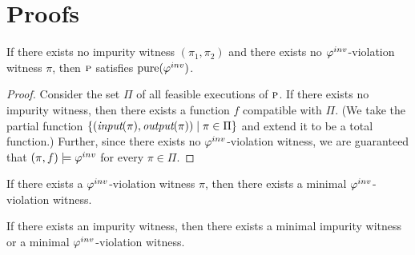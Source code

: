\section{Proofs}

\begin{lemma}
If there exists no impurity witness $(\pi_1,\pi_2)$ and there exists
no $\varphi^{inv}$-violation witness $\pi$, then $\textsc{p}$ satisfies $\mathrm{pure}(\varphi^{inv})$.
\end{lemma}

\begin{proof}
Consider the set $\Pi$ of all feasible executions of $\textsc{p}$.
If there exists no impurity witness, then there exists a function $f$ compatible with $\Pi$.
(We take the partial function $\{ (\textit{input}(\pi), \textit{output}(\pi)) \; | \; \pi \in \Pi \}$ and
extend it to be a total function.)
Further, since there exists no $\varphi^{inv}$-violation witness, we are guaranteed that $(\pi,f) \models \varphi^{inv}$
for every $\pi \in \Pi$.
\end{proof}

\begin{lemma}
If there exists a $\varphi^{inv}$-violation witness $\pi$, then there exists a minimal $\varphi^{inv}$-violation witness.
\end{lemma}

\begin{lemma}
If there exists an impurity witness, then there exists a minimal impurity witness or a minimal
$\varphi^{inv}$-violation witness.
\end{lemma}
